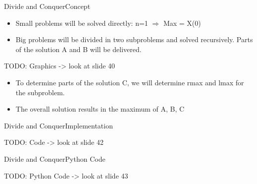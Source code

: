 \begin{frame}{Divide and Conquer}{Concept}
  \begin{itemize}
    \item
      Small problems will be solved directly: n=1 $\Rightarrow$ Max = X(0)
    \item
      Big problems will be divided in two subproblems and solved recursively. 
      Parts of the solution A and B will be delivered.
  \end{itemize}
  
  TODO: Graphics -> look at slide 40 \vspace{2em}
  
  \begin{itemize}
    \item
      To determine parts of the solution C, we will determine rmax and lmax for 
      the subproblem.
    \item
      The overall solution results in the maximum of A, B, C
  \end{itemize}
\end{frame}


\begin{frame}{Divide and Conquer}{Implementation}
  
  TODO: Code -> look at slide 42 \vspace{2em}
  
\end{frame}


\begin{frame}{Divide and Conquer}{Python Code}
  
  TODO: Python Code -> look at slide 43 \vspace{2em}
  
\end{frame}